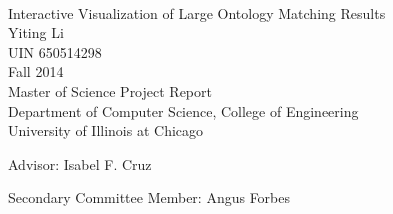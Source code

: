 
\thispagestyle{empty}
\mbox{}\\[6pc]
\begin{center}
\Huge{Interactive Visualization of Large Ontology Matching Results}\\[2pc]

\Large{Yiting Li}\\[1pc]
\large{UIN 650514298}\\[1pc]
\large{Fall 2014}\\[2pc]

Master of Science Project Report\\
Department of Computer Science, College of Engineering\\
University of Illinois at Chicago
\end{center}
\vfill

\noindent Advisor: Isabel F. Cruz

\noindent Secondary Committee Member: Angus Forbes

